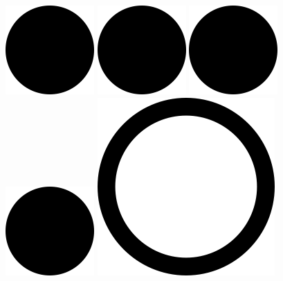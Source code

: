 \includegraphics[width=.40cm,height=.40cm]{images/rating/black_circle.png}
\hspace{0}
\includegraphics[width=.40cm,height=.40cm]{images/rating/black_circle.png}
\hspace{0}
\includegraphics[width=.40cm,height=.40cm]{images/rating/black_circle.png}
\hspace{0}
\includegraphics[width=.40cm,height=.40cm]{images/rating/black_circle.png}
\hspace{0}
\includegraphics[width=.40cm,height=.40cm]{images/rating/empty_circle.png}